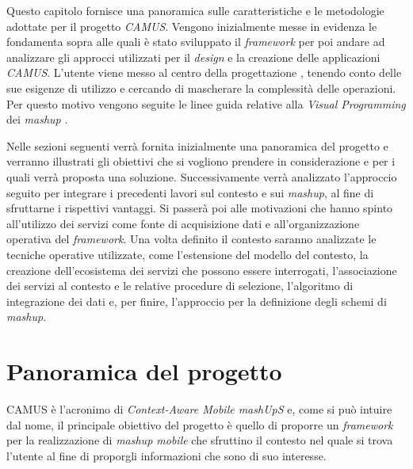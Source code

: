 Questo capitolo fornisce una panoramica sulle caratteristiche e le metodologie adottate per il progetto \emph{CAMUS}. Vengono inizialmente messe in evidenza le fondamenta sopra alle quali è stato sviluppato il \emph{framework} per poi andare ad analizzare gli approcci utilizzati per il \emph{design} e la creazione delle applicazioni \emph{CAMUS}. L'utente viene messo al centro della progettazione \cite{lieberman2006end}, tenendo conto delle sue esigenze di utilizzo e cercando di mascherare la complessità delle operazioni. Per questo motivo vengono seguite le linee guida relative alla \emph{Visual Programming} dei \emph{mashup} \cite{DBLP:journals/tweb/CappielloMP15}.

Nelle sezioni seguenti verrà fornita inizialmente una panoramica del progetto e verranno illustrati gli obiettivi che si vogliono prendere in considerazione e per i quali verrà proposta una soluzione. Successivamente verrà analizzato l'approccio seguito per integrare i precedenti lavori sul contesto e sui \emph{mashup}, al fine di sfruttarne i rispettivi vantaggi. Si passerà poi alle motivazioni che hanno spinto all'utilizzo dei servizi come fonte di acquisizione dati e all'organizzazione operativa del \emph{framework}. Una volta definito il contesto saranno analizzate le tecniche operative utilizzate, come l'estensione del modello del contesto, la creazione dell'ecosistema dei servizi che possono essere interrogati, l'associazione dei servizi al contesto e le relative procedure di selezione, l'algoritmo di integrazione dei dati e, per finire, l'approccio per la definizione degli schemi di \emph{mashup}.

\section{Panoramica del progetto\label{sec:panoramica-progetto}}

CAMUS è l'acronimo di \emph{Context-Aware Mobile mashUpS} e, come si può intuire dal nome, il principale obiettivo del progetto è quello di proporre un \emph{framework} per la realizzazione di \emph{mashup mobile} che sfruttino il contesto nel quale si trova l'utente al fine di proporgli informazioni che sono di suo interesse.

